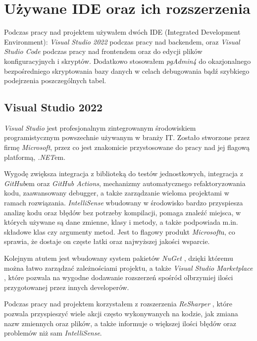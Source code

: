 \documentclass[a4paper,twoside,12pt]{book}
\begin{document}
\section{Używane IDE oraz ich rozszerzenia}

Podczas pracy nad projektem używałem dwóch IDE (Integrated Development Environment): \textit{Visual Studio 2022} podczas pracy nad backendem, oraz \textit{Visual Studio Code} podczas pracy nad frontendem oraz do edycji plików konfiguracyjnych i skryptów. Dodatkowo stosowałem \textit{pgAdmin4} \cite{pgadmin2025} do okazjonalnego bezpośredniego skryptowania bazy danych w celach debugowania bądź szybkiego podejrzenia poszczególnych tabel.

\subsection{Visual Studio 2022}

\textit{Visual Studio} jest profesjonalnym zintegrowanym środowiskiem programistycznym powszechnie używanym w branży IT. Zostało stworzone przez firmę \textit{Microsoft}, przez co jest znakomicie przystosowane do pracy nad jej flagową platformą, \textit{.NET}em. \cite{vs2022docs}

Wygodę zwiększa integracja z biblioteką do testów jednostkowych, integracja z \textit{GitHub}em oraz \textit{GitHub Actions}, mechanizmy automatycznego refaktoryzowania kodu, zaawansowany debugger, a także zarządzanie wieloma projektami w ramach rozwiązania. \textit{IntelliSense} wbudowany w środowisko bardzo przyspiesza analizę kodu oraz błędów bez potrzeby kompilacji, pomaga znaleźć miejsca, w których używane są dane zmienne, klasy i metody, a także podpowiada m.in. składowe klas czy argumenty metod. Jest to flagowy produkt \textit{Microsoft}u, co sprawia, że dostaje on częste łatki oraz najwyższej jakości wsparcie. 

Kolejnym atutem jest wbudowany system pakietów \textit{NuGet} \cite{nuget2025}, dzięki któremu można łatwo zarządzać zależnościami projektu, a także \textit{Visual Studio Marketplace} \cite{vsm2025}, które pozwala na wygodne dodawanie rozszerzeń spośród olbrzymiej ilości przygotowanej przez innych developerów. 

Podczas pracy nad projektem korzystałem z rozszerzenia \textit{ReSharper} \cite{resharper2025}, które pozwala przyspieszyć wiele akcji często wykonywanych na kodzie, jak zmiana nazw zmiennych oraz plików, a także informuje o większej ilości błędów oraz problemów niż sam \textit{IntelliSense}.
\end{document}
